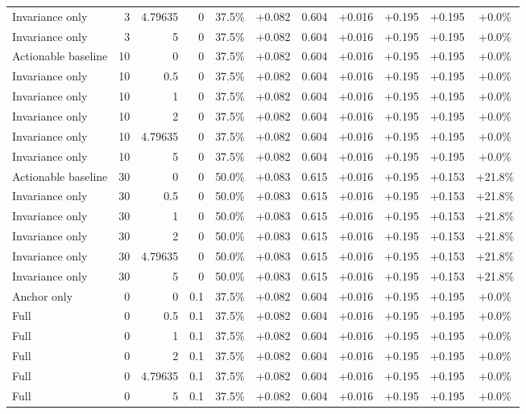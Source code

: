 \begin{table}[htbp]
\begin{tabular}{lrrrccccccc}
Invariance only & 3 & 4.79635 & 0 & 37.5\% & +0.082 & 0.604 & +0.016 & +0.195 & +0.195 & +0.0\% \\
Invariance only & 3 & 5 & 0 & 37.5\% & +0.082 & 0.604 & +0.016 & +0.195 & +0.195 & +0.0\% \\
Actionable baseline & 10 & 0 & 0 & 37.5\% & +0.082 & 0.604 & +0.016 & +0.195 & +0.195 & +0.0\% \\
Invariance only & 10 & 0.5 & 0 & 37.5\% & +0.082 & 0.604 & +0.016 & +0.195 & +0.195 & +0.0\% \\
Invariance only & 10 & 1 & 0 & 37.5\% & +0.082 & 0.604 & +0.016 & +0.195 & +0.195 & +0.0\% \\
Invariance only & 10 & 2 & 0 & 37.5\% & +0.082 & 0.604 & +0.016 & +0.195 & +0.195 & +0.0\% \\
Invariance only & 10 & 4.79635 & 0 & 37.5\% & +0.082 & 0.604 & +0.016 & +0.195 & +0.195 & +0.0\% \\
Invariance only & 10 & 5 & 0 & 37.5\% & +0.082 & 0.604 & +0.016 & +0.195 & +0.195 & +0.0\% \\
Actionable baseline & 30 & 0 & 0 & 50.0\% & +0.083 & 0.615 & +0.016 & +0.195 & +0.153 & +21.8\% \\
Invariance only & 30 & 0.5 & 0 & 50.0\% & +0.083 & 0.615 & +0.016 & +0.195 & +0.153 & +21.8\% \\
Invariance only & 30 & 1 & 0 & 50.0\% & +0.083 & 0.615 & +0.016 & +0.195 & +0.153 & +21.8\% \\
Invariance only & 30 & 2 & 0 & 50.0\% & +0.083 & 0.615 & +0.016 & +0.195 & +0.153 & +21.8\% \\
Invariance only & 30 & 4.79635 & 0 & 50.0\% & +0.083 & 0.615 & +0.016 & +0.195 & +0.153 & +21.8\% \\
Invariance only & 30 & 5 & 0 & 50.0\% & +0.083 & 0.615 & +0.016 & +0.195 & +0.153 & +21.8\% \\
Anchor only & 0 & 0 & 0.1 & 37.5\% & +0.082 & 0.604 & +0.016 & +0.195 & +0.195 & +0.0\% \\
Full & 0 & 0.5 & 0.1 & 37.5\% & +0.082 & 0.604 & +0.016 & +0.195 & +0.195 & +0.0\% \\
Full & 0 & 1 & 0.1 & 37.5\% & +0.082 & 0.604 & +0.016 & +0.195 & +0.195 & +0.0\% \\
Full & 0 & 2 & 0.1 & 37.5\% & +0.082 & 0.604 & +0.016 & +0.195 & +0.195 & +0.0\% \\
Full & 0 & 4.79635 & 0.1 & 37.5\% & +0.082 & 0.604 & +0.016 & +0.195 & +0.195 & +0.0\% \\
Full & 0 & 5 & 0.1 & 37.5\% & +0.082 & 0.604 & +0.016 & +0.195 & +0.195 & +0.0\% \\

\end{tabular}
\end{table}
